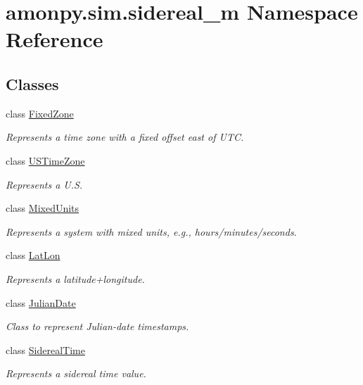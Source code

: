 \hypertarget{namespaceamonpy_1_1sim_1_1sidereal__m}{\section{amonpy.\-sim.\-sidereal\-\_\-m Namespace Reference}
\label{namespaceamonpy_1_1sim_1_1sidereal__m}
}
\subsection*{Classes}
\begin{DoxyCompactItemize}
\item 
class \hyperlink{classamonpy_1_1sim_1_1sidereal__m_1_1_fixed_zone}{Fixed\-Zone}
\begin{DoxyCompactList}\small\item\em Represents a time zone with a fixed offset east of U\-T\-C. \end{DoxyCompactList}\item 
class \hyperlink{classamonpy_1_1sim_1_1sidereal__m_1_1_u_s_time_zone}{U\-S\-Time\-Zone}
\begin{DoxyCompactList}\small\item\em Represents a U.\-S. \end{DoxyCompactList}\item 
class \hyperlink{classamonpy_1_1sim_1_1sidereal__m_1_1_mixed_units}{Mixed\-Units}
\begin{DoxyCompactList}\small\item\em Represents a system with mixed units, e.\-g., hours/minutes/seconds. \end{DoxyCompactList}\item 
class \hyperlink{classamonpy_1_1sim_1_1sidereal__m_1_1_lat_lon}{Lat\-Lon}
\begin{DoxyCompactList}\small\item\em Represents a latitude+longitude. \end{DoxyCompactList}\item 
class \hyperlink{classamonpy_1_1sim_1_1sidereal__m_1_1_julian_date}{Julian\-Date}
\begin{DoxyCompactList}\small\item\em Class to represent Julian-\/date timestamps. \end{DoxyCompactList}\item 
class \hyperlink{classamonpy_1_1sim_1_1sidereal__m_1_1_sidereal_time}{Sidereal\-Time}
\begin{DoxyCompactList}\small\item\em Represents a sidereal time value. \end{DoxyCompactList}\item 

\end{DoxyCompactItemize}

